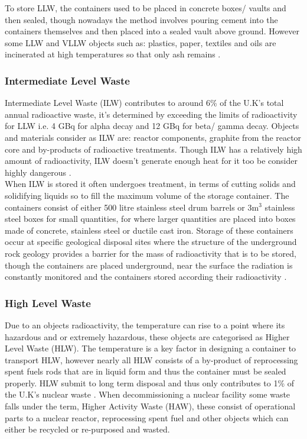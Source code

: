 To store LLW, the containers used to be placed in concrete boxes/ vaults and then sealed, though nowadays the method involves pouring cement into the containers themselves and then placed into a sealed vault above ground. However some LLW and VLLW objects such as: plastics, paper, textiles and oils are incinerated at high temperatures so that only ash remains \cite{ManageNuclearWaste}.

\subsubsection*{Intermediate Level Waste}
\label{Intermediate Level Waste SubSubSection}

Intermediate Level Waste (ILW) contributes to around 6\% of the U.K's total annual radioactive waste, it's determined by exceeding the limits of radioactivity for LLW i.e. 4 GBq for alpha decay and 12 GBq for beta/ gamma decay. Objects and materials consider as ILW are: reactor components, graphite from the reactor core and by-products of radioactive treatments. Though ILW has a relatively high amount of radioactivity, ILW doesn't generate enough heat for it too be consider highly dangerous \cite{NuclearWasteTypes}.\\

When ILW is stored it often undergoes treatment, in terms of cutting solids and solidifying liquids so to fill the maximum volume of the storage container. The containers consist of either 500 litre stainless steel drum barrels or 3m$^3$ stainless steel boxes for small quantities, for where larger quantities are placed into boxes made of concrete, stainless steel or ductile cast iron. Storage of these containers occur at specific geological disposal sites where the structure of the underground rock geology provides a barrier for the mass of radioactivity that is to be stored, though the containers are placed underground, near the surface the radiation is constantly monitored and the containers stored according their radioactivity \cite{ManageNuclearWaste}. 

\subsubsection*{High Level Waste}
\label{High Level Waste SubSubSection}

Due to an objects radioactivity, the temperature can rise to a point where its hazardous and or extremely hazardous, these objects are categorised as Higher Level Waste (HLW). The temperature is a key factor in designing a container to transport HLW, however nearly all HLW consists of a by-product of reprocessing spent fuels rods that are in liquid form and thus the container must be sealed properly. HLW submit to long term disposal and thus only contributes to 1\% of the U.K's nuclear waste \cite{NuclearWasteTypes}. When decommissioning a nuclear facility some waste falls under the term, Higher Activity Waste (HAW), these consist of operational parts to a nuclear reactor, reprocessing spent fuel and other objects which can either be recycled or re-purposed and wasted. \\

